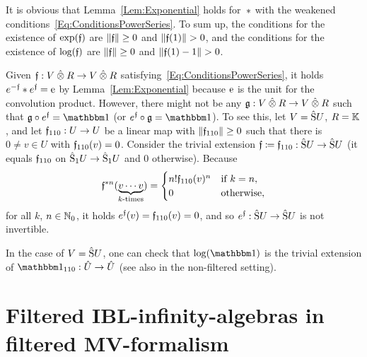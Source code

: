 \documentclass[\MainFolder/Text.tex]{subfiles}
\begin{document}
\begin{Remark}\label{Rem:ExpLogStar}
\begin{RemarkList}
\item It is obvious that Lemma~\ref{Lem:Exponential} holds for~$*$ with the weakened conditions~\eqref{Eq:ConditionsPowerSeries}. To sum up, the conditions for the existence of $\exp(\mathfrak{f})$ are $\| \mathfrak{f} \|\ge 0$ and $\Norm{\MVMorF(1)}>0$, and the conditions for the existence of $\log(\mathfrak{f})$ are $\| \mathfrak{f} \|\ge 0$ and $\Norm{\MVMorF(1) - 1}>0$.

\item Given $\MVMorF: V\COtimes R \rightarrow V\COtimes R$ satisfying~\eqref{Eq:ConditionsPowerSeries}, it holds $e^{-\mathfrak{f}}* e^{\mathfrak{f}} = \mathrm{e}$ by Lemma~\ref{Lem:Exponential} because $\mathrm{e}$ is the unit for the convolution product. However, there might not be any $\MVMorG: V\COtimes R \rightarrow V\COtimes R$ such that $\MVMorG \circ e^{\MVMorF} = \Id$ (or $e^{\MVMorF}\circ\MVMorG = \Id$). To see this, let $V=\hat{\mathrm{S}} U$, $R=\mathbb{K}$, and let $\mathfrak{f}_{110}: U \rightarrow U$ be a linear map with $\| \mathfrak{f}_{110} \|\ge 0$ such that there is $0 \neq v\in U$ with $\mathfrak{f}_{110}(v)=0$. Consider the trivial extension $\mathfrak{f}\coloneqq \mathfrak{f}_{110}: \hat{\mathrm{S}}U\rightarrow\hat{\mathrm{S}}U$ (it equals $\mathfrak{f}_{110}$ on $\hat{\mathrm{S}}_1 U\rightarrow \hat{\mathrm{S}}_1 U$ and $0$ otherwise). Because
$$ \mathfrak{f}^{* n}(\underbrace{v \dotsb v}_{k\text{-times}}) = \begin{cases}
 n! \mathfrak{f}_{110}(v)^n & \text{if } k = n, \\
 0 & \text{otherwise},
\end{cases}$$
for all $k$, $n\in\mathbb{N}_0$, it holds $e^{\mathfrak{f}}(v) = \mathfrak{f}_{110}(v) = 0$, and so $e^{\mathfrak{f}}: \hat{\mathrm{S}}U\rightarrow \hat{\mathrm{S}}U$ is not invertible.

\item In the case of $V=\hat{\mathrm{S}}U$, one can check that $\log(\Id)$ is the trivial extension of $\Id_{110}: \hat{U}\rightarrow \hat{U}$ (see also \cite[Example~21]{Markl2015} in the non-filtered setting).\qedhere
\end{RemarkList}
\end{Remark}


\section{Filtered IBL-infinity-algebras in filtered MV-formalism}\label{Sec:FilteredMV}
\end{document}
